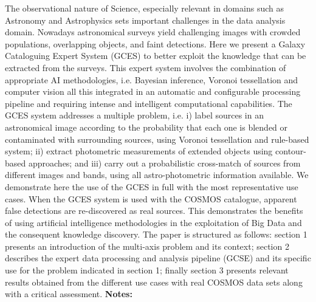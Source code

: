 \documentclass{report}
\begin{document}
{{{{{{{{{{{{{{{{{{{{{{{{{{{{{{{{{{{{{{{{{{{{{{{{{{{{{{{{{{{{{{{{{{{{{{{{{{{{{{{{{{{{{{{{{{{{{{{{{{{{{{{{{{{{{{{{{{The observational nature of Science, especially relevant in domains such as Astronomy and Astrophysics sets important challenges in the data analysis domain. Nowadays astronomical surveys yield challenging images with crowded populations, overlapping objects, and faint detections. Here we present a Galaxy Cataloguing Expert System (GCES) to better exploit the knowledge that can be extracted from the surveys. This expert system involves the combination of appropriate AI methodologies, i.e. Bayesian inference, Voronoi tessellation and computer vision all this integrated in an automatic and configurable processing pipeline and requiring intense and intelligent computational capabilities. The GCES system addresses a multiple problem, i.e. i) label sources in an astronomical image according to the probability that each one is blended or contaminated with surrounding sources, using Voronoi tessellation and rule-based system; ii) extract photometric measurements of extended objects using contour-based approaches; and iii) carry out a probabilistic cross-match of sources from different images and bands, using all astro-photometric information available. We demonstrate here the use of the GCES in full with the most representative use cases. When the GCES system is used with the COSMOS catalogue, apparent false detections are re-discovered as real sources. This demonstrates the benefits of using artificial intelligence methodologies in the exploitation of Big Data and the consequent knowledge discovery. The paper is structured as follows: section 1 presents an introduction of the multi-axis problem and its context; section 2 describes the expert data processing and analysis pipeline (GCSE) and its specific use for the problem indicated in section 1; finally section 3 presents relevant results obtained from the different use cases with real COSMOS data sets along with a critical assessment.\newline
{\bf Notes:}\newline
{\newpage
}}}}}}}}}}}}}}}}}}}}}}}}}}}}}}}}}}}}}}}}}}}}}}}}}}}}}}}}}}}}}}}}}}}}}}}}}}}}}}}}}}}}}}}}}}}}}}}}}}}}}}}}}}}}}}}}}}}
\end{document}
